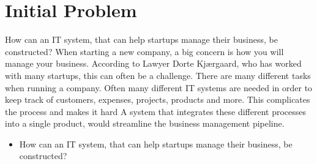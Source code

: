 \section{Initial Problem}How can an IT system, that can help startups manage their business, be constructed?
When starting a new company, a big concern is how you will manage your business. 
According to Lawyer Dorte Kjærgaard, who has worked with many startups, this can often be a challenge. There are many different tasks when running a company. Often many different IT systems are needed in order to keep track of customers, expenses, projects, products and more. This complicates the process and makes it hard
A system that integrates these different processes into a single product, would streamline the business management pipeline. \\

\begin{itemize}
  \item How can an IT system, that can help startups manage their business, be constructed?
\end{itemize}